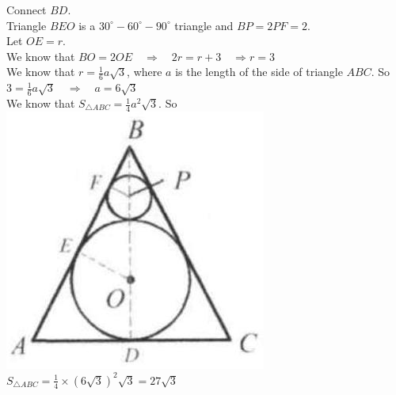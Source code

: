 \documentclass{article}
\begin{document}
Connect \(B D\).\\
Triangle \(B E O\) is a \(30^{\circ}-60^{\circ}-90^{\circ}\) triangle and \(B P=2 P F=2\).\\
Let \(O E=r\).\\
We know that \(B O=2 O E \quad \Rightarrow \quad 2 r=r+3 \quad \Rightarrow r=3\)\\
We know that \(r=\frac{1}{6} a \sqrt{3}\), where \(a\) is the length of the side of triangle \(A B C\). So \(3=\frac{1}{6} a \sqrt{3} \quad \Rightarrow \quad a=6 \sqrt{3}\)\\
We know that \(S_{\triangle A B C}=\frac{1}{4} a^{2} \sqrt{3}\). So\\
\centering
\includegraphics[width=\textwidth]{images/reasoning_image_1.jpg}\\
\(S_{\triangle A B C}=\frac{1}{4} \times(6 \sqrt{3})^{2} \sqrt{3}=27 \sqrt{3}\)\\
\end{document}
